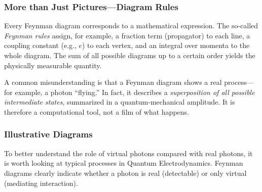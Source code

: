 \subsubsection*{More than Just Pictures—Diagram Rules}
{}
Every Feynman diagram corresponds to a mathematical expression. The so-called \emph{Feynman rules} assign, for example, a fraction term (propagator) to each line, a coupling constant (e.g., $e$) to each vertex, and an integral over momenta to the whole diagram. The sum of all possible diagrams up to a certain order yields the physically measurable quantity.

\vspace{1em}
\begin{tcolorbox}[didaktikbox, title=A Diagram Is Not Reality]
	\label{boxx:Diagramm ist nicht gleich realität}
	A common misunderstanding is that a Feynman diagram shows a real process—for example, a photon “flying.” In fact, it describes a \emph{superposition of all possible intermediate states}, summarized in a quantum-mechanical amplitude. It is therefore a computational tool, not a film of what happens.
\end{tcolorbox}

\subsubsection{Illustrative Diagrams}

To better understand the role of virtual photons compared with real photons, it is worth looking at typical processes in Quantum Electrodynamics. Feynman diagrams clearly indicate whether a photon is real (detectable) or only virtual (mediating interaction).

